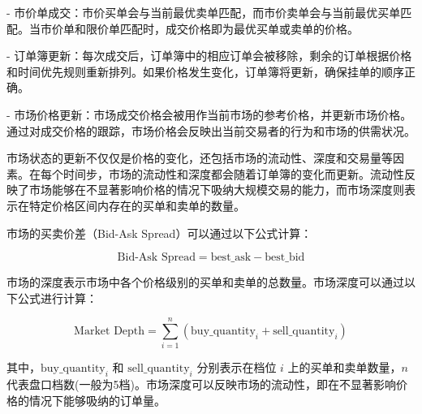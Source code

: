 - 市价单成交：市价买单会与当前最优卖单匹配，而市价卖单会与当前最优买单匹配。当市价单和限价单匹配时，成交价格即为最优买单或卖单的价格。
   
- 订单簿更新：每次成交后，订单簿中的相应订单会被移除，剩余的订单根据价格和时间优先规则重新排列。如果价格发生变化，订单簿将更新，确保挂单的顺序正确。

- 市场价格更新：市场成交价格会被用作当前市场的参考价格，并更新市场价格。通过对成交价格的跟踪，市场价格会反映出当前交易者的行为和市场的供需状况。

市场状态的更新不仅仅是价格的变化，还包括市场的流动性、深度和交易量等因素。在每个时间步，市场的流动性和深度都会随着订单簿的变化而更新。流动性反映了市场能够在不显著影响价格的情况下吸纳大规模交易的能力，而市场深度则表示在特定价格区间内存在的买单和卖单的数量。

市场的买卖价差（Bid-Ask Spread）可以通过以下公式计算：

\begin{equation}
    \text{Bid-Ask Spread} = \text{best\_ask} - \text{best\_bid}
\end{equation}

市场的深度表示市场中各个价格级别的买单和卖单的总数量。市场深度可以通过以下公式进行计算：

\begin{equation}
    \text{Market Depth} = \sum_{i=1}^{n} (\text{buy\_quantity}_i + \text{sell\_quantity}_i)
\end{equation}

其中，\( \text{buy\_quantity}_i \) 和 \( \text{sell\_quantity}_i \) 分别表示在档位 \( i \) 上的买单和卖单数量，\( n \)代表盘口档数(一般为5档)。市场深度可以反映市场的流动性，即在不显著影响价格的情况下能够吸纳的订单量。

